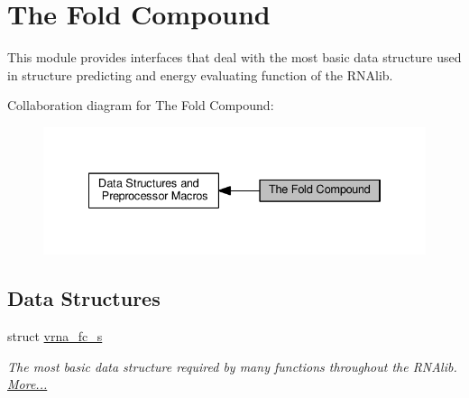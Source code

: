 \hypertarget{group__fold__compound}{}\section{The Fold Compound}
\label{group__fold__compound}


This module provides interfaces that deal with the most basic data structure used in structure predicting and energy evaluating function of the R\+N\+Alib.  


Collaboration diagram for The Fold Compound\+:
\nopagebreak
\begin{figure}[H]
\begin{center}
\leavevmode
\includegraphics[width=334pt]{group__fold__compound}
\end{center}
\end{figure}
\subsection*{Data Structures}
\begin{DoxyCompactItemize}
\item 
struct \hyperlink{group__fold__compound_structvrna__fc__s}{vrna\+\_\+fc\+\_\+s}
\begin{DoxyCompactList}\small\item\em The most basic data structure required by many functions throughout the R\+N\+Alib.  \hyperlink{group__fold__compound_structvrna__fc__s}{More...}\end{DoxyCompactList}\end{DoxyCompactItemize}
